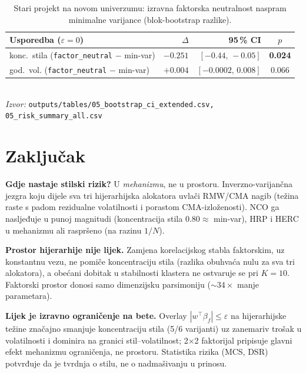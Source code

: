 \documentclass[11pt]{article}
\newcommand{\izvor}[1]{{\footnotesize\textit{Izvor:} \texttt{#1}}}
\begin{document}
\begin{table}[!htbp]
  \centering
  \caption{Stari projekt na novom univerzumu: izravna faktorska neutralnost
  naspram minimalne varijance (blok-bootstrap razlike).}
  \label{tab:oldproj}
  \small
  \begin{tabular}{lrrc}
    \toprule
    Usporedba ($\varepsilon{=}0$) & $\Delta$ & 95\,\% CI & $p$ \\
    \midrule
    konc.\ stila (\texttt{factor\_neutral} $-$ min-var) & $\mathbf{-0.251}$ & $[-0.44,\,-0.05]$ & \textbf{0.024} \\
    god.\ vol. (\texttt{factor\_neutral} $-$ min-var)   & $+0.004$ & $[-0.0002,\,0.008]$ & 0.066 \\
    \bottomrule
  \end{tabular}\\[0.3em]
  \izvor{outputs/tables/05\_bootstrap\_ci\_extended.csv, 05\_risk\_summary\_all.csv}
\end{table}
\FloatBarrier

\section{Zaključak}

\textbf{Gdje nastaje stilski rizik?} U \emph{mehanizmu}, ne u prostoru.
Inverzno-varijančna jezgra koju dijele sva tri hijerarhijska alokatora uvlači
RMW/CMA nagib (težina raste s padom rezidualne volatilnosti i porastom
CMA-izloženosti). NCO ga nasljeđuje u punoj magnitudi (koncentracija stila
$0.80\approx$ min-var), HRP i HERC u mehanizmu ali raspršeno (na razinu $1/N$).

\textbf{Prostor hijerarhije nije lijek.} Zamjena korelacijskog stabla faktorskim,
uz konstantnu vezu, ne pomiče koncentraciju stila (razlika obuhvaća nulu za sva
tri alokatora), a obećani dobitak u stabilnosti klastera ne ostvaruje se pri
$K=10$. Faktorski prostor donosi samo dimenzijsku parsimoniju ($\sim 34\times$
manje parametara).

\textbf{Lijek je izravno ograničenje na bete.} Overlay
$|w^{\!\top}\beta_f|\le\varepsilon$ na hijerarhijske težine značajno smanjuje
koncentraciju stila (5/6 varijanti) uz zanemariv trošak u volatilnosti i dominira
na granici stil--volatilnost; 2$\times$2 faktorijal pripisuje glavni efekt
mehanizmu ograničenja, ne prostoru. Statistika rizika (MCS, DSR) potvrđuje da je
tvrdnja o stilu, ne o nadmašivanju u prinosu.
\end{document}
